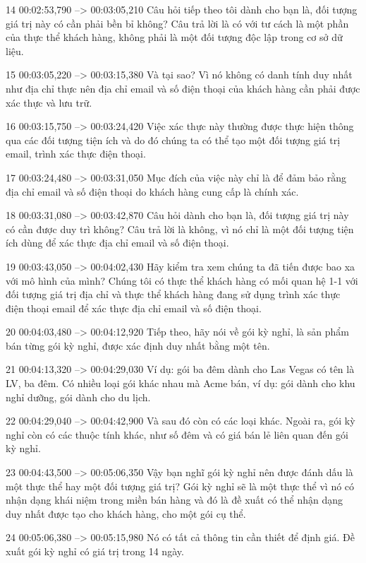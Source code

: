 14
00:02:53,790 --> 00:03:05,210
Câu hỏi tiếp theo tôi dành cho bạn là, đối tượng giá trị này có cần phải bền bỉ không?  Câu trả lời là có với tư cách là một phần của thực thể khách hàng, không phải là một đối tượng độc lập trong cơ sở dữ liệu.

15
00:03:05,220 --> 00:03:15,380
Và tại sao?  Vì nó không có danh tính duy nhất như địa chỉ thực nên địa chỉ email và số điện thoại của khách hàng cần phải được xác thực và lưu trữ.

16
00:03:15,750 --> 00:03:24,420
Việc xác thực này thường được thực hiện thông qua các đối tượng tiện ích và do đó chúng ta có thể tạo một đối tượng giá trị email, trình xác thực điện thoại.

17
00:03:24,480 --> 00:03:31,050
Mục đích của việc này chỉ là để đảm bảo rằng địa chỉ email và số điện thoại do khách hàng cung cấp là chính xác.

18
00:03:31,080 --> 00:03:42,870
Câu hỏi dành cho bạn là, đối tượng giá trị này có cần được duy trì không?  Câu trả lời là không, vì nó chỉ là một đối tượng tiện ích dùng để xác thực địa chỉ email và số điện thoại.

19
00:03:43,050 --> 00:04:02,430
Hãy kiểm tra xem chúng ta đã tiến được bao xa với mô hình của mình?  Chúng tôi có thực thể khách hàng có mối quan hệ 1-1 với đối tượng giá trị địa chỉ và thực thể khách hàng đang sử dụng trình xác thực điện thoại email để xác thực địa chỉ email và số điện thoại.

20
00:04:03,480 --> 00:04:12,920
Tiếp theo, hãy nói về gói kỳ nghỉ, là sản phẩm bán từng gói kỳ nghỉ, được xác định duy nhất bằng một tên.

21
00:04:13,320 --> 00:04:29,030
Ví dụ: gói ba đêm dành cho Las Vegas có tên là LV, ba đêm.  Có nhiều loại gói khác nhau mà Acme bán, ví dụ: gói dành cho khu nghỉ dưỡng, gói dành cho du lịch.

22
00:04:29,040 --> 00:04:42,900
Và sau đó còn có các loại khác.  Ngoài ra, gói kỳ nghỉ còn có các thuộc tính khác, như số đêm và có giá bán lẻ liên quan đến gói kỳ nghỉ.

23
00:04:43,500 --> 00:05:06,350
Vậy bạn nghĩ gói kỳ nghỉ nên được đánh dấu là một thực thể hay một đối tượng giá trị?  Gói kỳ nghỉ sẽ là một thực thể vì nó có nhận dạng khái niệm trong miền bán hàng và đó là đề xuất có thể nhận dạng duy nhất được tạo cho khách hàng, cho một gói cụ thể.

24
00:05:06,380 --> 00:05:15,980
Nó có tất cả thông tin cần thiết để định giá.  Đề xuất gói kỳ nghỉ có giá trị trong 14 ngày.

